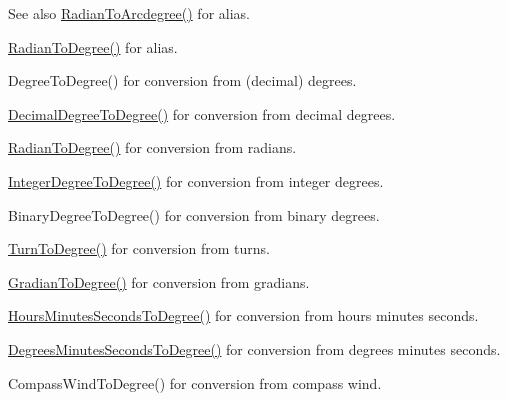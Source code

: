 \begin{DoxySeeAlso}{See also}
\mbox{\hyperlink{group___e_g_x_math-_angle_conversions-_radian_ga3dfdc97357cc07f8379976bbc08f9852}{Radian\+To\+Arcdegree()}} for alias. 

\mbox{\hyperlink{group___e_g_x_math-_angle_conversions-_radian_ga25bbce6cdc1c3621f2a158d320e3bc45}{Radian\+To\+Degree()}} for alias. 

Degree\+To\+Degree() for conversion from (decimal) degrees. 

\mbox{\hyperlink{group___e_g_x_math-_angle_conversions-_decimal_degree_ga0aa7f2f5dbb00cf4ab303421c6e33ccf}{Decimal\+Degree\+To\+Degree()}} for conversion from decimal degrees. 

\mbox{\hyperlink{group___e_g_x_math-_angle_conversions-_radian_ga25bbce6cdc1c3621f2a158d320e3bc45}{Radian\+To\+Degree()}} for conversion from radians. 

\mbox{\hyperlink{group___e_g_x_math-_angle_conversions-_integer_degree_gaa9b63c6095fd7f8809fcfa2ba1e62235}{Integer\+Degree\+To\+Degree()}} for conversion from integer degrees. 

Binary\+Degree\+To\+Degree() for conversion from binary degrees. 

\mbox{\hyperlink{group___e_g_x_math-_angle_conversions-_turn_ga19eceb6db54a1cf17789639c2a869cb9}{Turn\+To\+Degree()}} for conversion from turns. 

\mbox{\hyperlink{group___e_g_x_math-_angle_conversions-_gradian_gaa284952274f16d225951cf5139d0ff4e}{Gradian\+To\+Degree()}} for conversion from gradians. 

\mbox{\hyperlink{group___e_g_x_math-_angle_conversions-_hours_minutes_seconds_ga4f66698550a0cf0fd326f25aba2c0d80}{Hours\+Minutes\+Seconds\+To\+Degree()}} for conversion from hours minutes seconds. 

\mbox{\hyperlink{group___e_g_x_math-_angle_conversions-_degrees_minutes_seconds_gae59bfb37c0751e60e315f8a1ed3dc0cf}{Degrees\+Minutes\+Seconds\+To\+Degree()}} for conversion from degrees minutes seconds. 

Compass\+Wind\+To\+Degree() for conversion from compass wind. 
\end{DoxySeeAlso}
\mbox{\label{group___e_g_x_math-_angle_conversions-_radian_gadae98c255924fdc8b232b6539eae81a9}} 
